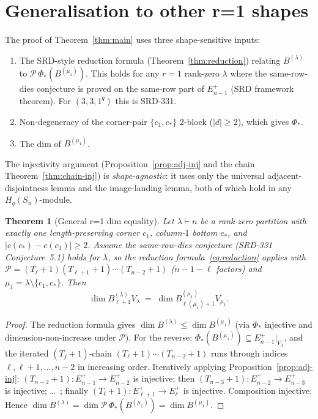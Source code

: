 \documentclass[11pt]{article}
\newtheorem{theorem}{Theorem}
\theoremstyle{definition}
\begin{document}
\section{Generalisation to other r=1 shapes}\label{sec:general}

The proof of Theorem~\ref{thm:main} uses three shape-sensitive
inputs:
\begin{enumerate}[leftmargin=2em,topsep=0.2em,itemsep=0.1em]
\item The SRD-style reduction formula (Theorem~\ref{thm:reduction})
relating $B^{(\lambda)}$ to $\mathcal{P}\,\Phi_*(B^{(\mu_1)})$. This
holds for any $r = 1$ rank-zero $\lambda$ where the same-row-dies
conjecture is proved on the same-row part of $E_{n-1}^+$ (SRD
framework theorem). For $(3, 3, 1^q)$ this is SRD-331.
\item Non-degeneracy of the corner-pair $\{c_1, c_*\}$ $2$-block
($|d| \ge 2$), which gives $\Phi_*$.
\item The dim of $B^{(\mu_1)}$.
\end{enumerate}

The injectivity argument (Proposition~\ref{prop:adj-inj} and the
chain Theorem~\ref{thm:chain-inj}) is \emph{shape-agnostic}: it uses
only the universal adjacent-disjointness lemma and the image-landing
lemma, both of which hold in any $H_q(S_n)$-module.

\begin{theorem}[General r=1 dim equality]\label{thm:general}
Let $\lambda \vdash n$ be a rank-zero partition with exactly one
length-preserving corner $c_1$, column-$1$ bottom $c_*$, and
$|c(c_*) - c(c_1)| \ge 2$. Assume the same-row-dies conjecture
(SRD-331 Conjecture~5.1) holds for $\lambda$, so the reduction
formula~\eqref{eq:reduction} applies with
$\mathcal{P} = (T_\ell{+}1)(T_{\ell+1}{+}1)\cdots(T_{n-2}{+}1)$
($n - 1 - \ell$ factors) and $\mu_1 = \lambda \setminus \{c_1, c_*\}$.
Then
\[
   \dim B_{\ell+1}^{(\lambda)} V_\lambda
   \;=\;
   \dim B_{\ell(\mu_1)+1}^{(\mu_1)} V_{\mu_1}.
\]
\end{theorem}

\begin{proof}
The reduction formula gives $\dim B^{(\lambda)} \le \dim B^{(\mu_1)}$
(via $\Phi_*$ injective and dimension-non-increase under
$\mathcal{P}$). For the reverse: $\Phi_*(B^{(\mu_1)}) \subseteq
E_{n-1}^+|_{V_\lambda}$, and the iterated $(T_j + 1)$-chain
$(T_\ell+1)\cdots(T_{n-2}+1)$ runs through indices $\ell, \ell+1,
\ldots, n - 2$ in increasing order. Iteratively applying
Proposition~\ref{prop:adj-inj}: $(T_{n-2}+1) : E_{n-1}^+ \to E_{n-2}^+$
is injective; then $(T_{n-3}+1) : E_{n-2}^+ \to E_{n-3}^+$ is
injective; \ldots\ ; finally $(T_\ell + 1) : E_{\ell+1}^+ \to E_\ell^+$
is injective. Composition injective. Hence
$\dim B^{(\lambda)} = \dim \mathcal{P}\,\Phi_*(B^{(\mu_1)})
= \dim B^{(\mu_1)}$.
\end{proof}
\end{document}
